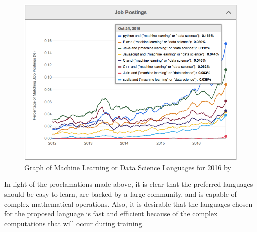 \begin{figure}[ht]
	\begin{center}
		\advance\leftskip-3cm
		\advance\rightskip-3cm
		\includegraphics[keepaspectratio=true,scale=0.6]{__resources/research/top_lang.jpg}
		\caption{Graph of Machine Learning or Data Science Languages for 2016 by \cite{verma_2017}}
		\label{verma}
	\end{center}
\end{figure}

In light of the proclamations made above, it is clear that the preferred languages should be easy to learn, are backed by a large community, and is capable of complex mathematical operations. Also, it is desirable that the languages chosen for the proposed language is fast and efficient because of the complex computations that will occur during training.

\newpage

